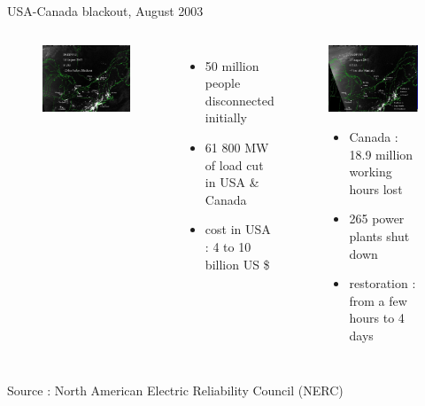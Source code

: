 \begin{frame}{USA-Canada blackout, August 2003}
\begin{columns}
\begin{figure}
\centering
\includegraphics[width=0.7\linewidth]{images/pre_blackout_US.png}
\end{figure}
\begin{itemize}
\item 50 million people disconnected initially
\item 61 800 MW of load cut in USA \& Canada
\item cost in USA : 4 to 10 billion US \$
\end{itemize}
\begin{figure}
\centering
\includegraphics[width=0.7\linewidth]{images/post_blackout_US.png}
\begin{itemize}
\item Canada : 18.9 million working hours lost
\item 265 power plants shut down
\item restoration : from a few hours to 4 days
\end{itemize}
\end{figure}
\end{columns}

\footnotesize{Source : North American Electric Reliability Council (NERC)}
\end{frame}

